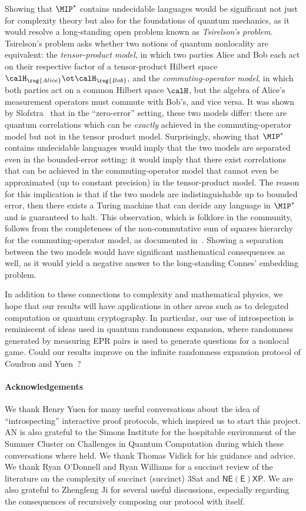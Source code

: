 Showing that $\MIP^*$ contains undecidable languages would be
significant not just for complexity theory but also for the
foundations of quantum mechanics, as it would resolve a long-standing
open problem known as \emph{Tsirelson's problem}. Tsirelson's problem
asks whether two notions of quantum nonlocality are equivalent: the
\emph{tensor-product model}, in which two parties Alice and Bob each
act on their respective factor of a tensor-product Hilbert space
$\calH_{\reg{Alice}} \ot \calH_{\reg{Bob}}$, and the
\emph{commuting-operator model}, in which both parties act on a common
Hilbert space $\calH$, but the algebra of Alice's measurement
operators must commute with Bob's, and vice versa. It was shown by
Slofstra~\cite{Slo16} that in the ``zero-error'' setting, these two
models differ: there are quantum correlations which can be
\emph{exactly} achieved in the commuting-operator model but not in the
tensor product model. Surprisingly, showing that $\MIP^*$ contains
undecidable languages would imply that the two models are separated
even in the bounded-error setting: it would imply that there exist
correlations that can be achieved in the commuting-operator model that cannot
even be approximated (up to constant precision) in the tensor-product
model. The reason for this implication is that if the two models are
indistinguishable up to bounded error, then there exists a Turing machine
that can decide any language in $\MIP^*$ and is guaranteed to halt. 
This observation, which is folklore in the community, follows from the completeness of the non-commutative
sum of squares hierarchy for the commuting-operator model, as
documented in~\cite{FJVY19}. Showing a separation between the two
models would have significant mathematical consequences as well, as it
would yield a negative answer to the long-standing Connes' embedding problem.

In addition to these connections to complexity and mathematical
physics, we hope that our results will have applications in other
areas such as to delegated computation or quantum cryptography. In particular,
our use of introspection is reminiscent of ideas used in quantum
randomness expansion, where randomness generated by measuring EPR
pairs is used to generate questions for a nonlocal game. Could our
results improve on the infinite randomness expansion protocol of
Coudron and Yuen~\cite{CY14}?
\paragraph{Acknowledgements}
We thank Henry Yuen for many useful conversations about the idea of
``introspecting'' interactive proof protocols, which inspired us to
start this project. AN is also grateful to the Simons Institute for
the hospitable environment of the Summer Cluster on Challenges in
Quantum Computation during which these conversations where held. We thank Thomas Vidick for his guidance and advice.  We thank Ryan O'Donnell and
Ryan Williams for a succinct review of the literature on the
complexity of succinct (succinct) 3Sat and $\mathsf{NE(E)XP}$. We are
also grateful to Zhengfeng Ji for several useful discussions, especially regarding the
consequences of recursively composing our protocol with itself.

